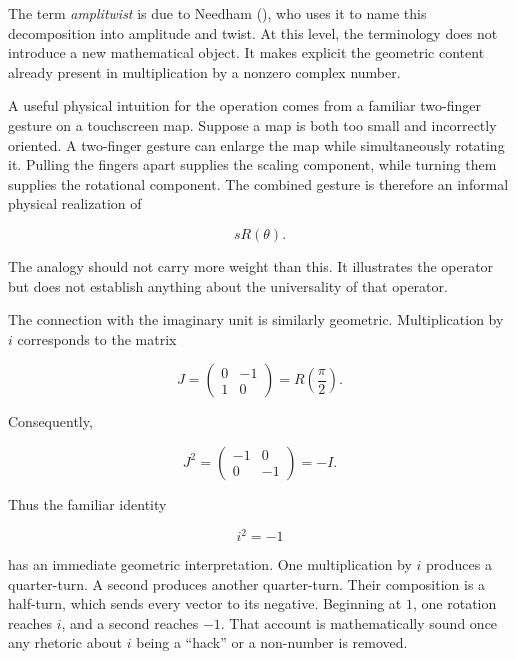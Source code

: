 \documentclass[11pt]{article}
\begin{document}
The term \emph{amplitwist} is due to Needham (\citeyear{Needham1997}), who uses it to name this decomposition into amplitude and twist. At this level, the terminology does not introduce a new mathematical object. It makes explicit the geometric content already present in multiplication by a nonzero complex number.

A useful physical intuition for the operation comes from a familiar two-finger gesture on a touchscreen map. Suppose a map is both too small and incorrectly oriented. A two-finger gesture can enlarge the map while simultaneously rotating it. Pulling the fingers apart supplies the scaling component, while turning them supplies the rotational component. The combined gesture is therefore an informal physical realization of

\begin{equation}
sR(\theta).
\end{equation}

The analogy should not carry more weight than this. It illustrates the operator but does not establish anything about the universality of that operator.

The connection with the imaginary unit is similarly geometric. Multiplication by $i$ corresponds to the matrix

\begin{equation}
J
=
\begin{pmatrix}
0 & -1\\
1 & 0
\end{pmatrix}
=
R\left(\frac{\pi}{2}\right).
\end{equation}

Consequently,

\begin{equation}
J^2
=
\begin{pmatrix}
-1 & 0\\
0 & -1
\end{pmatrix}
=
-I.
\end{equation}

Thus the familiar identity

\begin{equation}
i^2=-1
\end{equation}

has an immediate geometric interpretation. One multiplication by $i$ produces a quarter-turn. A second produces another quarter-turn. Their composition is a half-turn, which sends every vector to its negative. Beginning at $1$, one rotation reaches $i$, and a second reaches $-1$. That account is mathematically sound once any rhetoric about $i$ being a ``hack'' or a non-number is removed.
\end{document}
